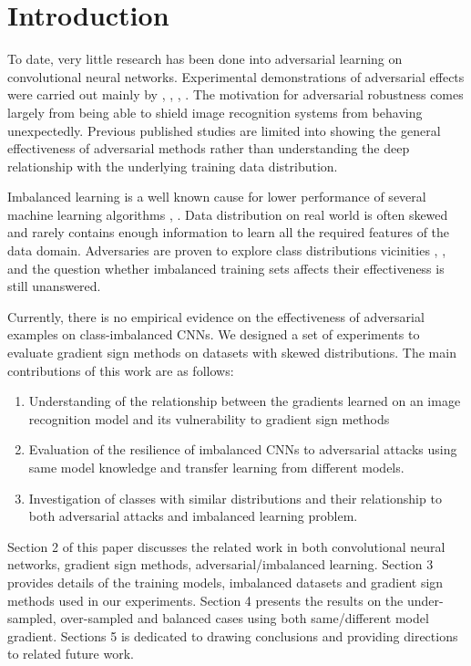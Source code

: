 \documentclass[runningheads,a4paper]{llncs}
\begin{document}
\section{Introduction}


To date, very little research has been done into adversarial learning on convolutional neural networks. Experimental demonstrations of adversarial effects were carried out mainly by \cite{billovits}, \cite{goodfellow2014}, \cite{goodfellow2016}, \cite{papernot2016}. The motivation for adversarial robustness comes largely from being able to shield image recognition systems from behaving unexpectedly. Previous published studies are limited into showing the general effectiveness of adversarial methods rather than understanding the deep relationship with the underlying training data distribution.

Imbalanced learning is a well known cause for lower performance of several machine learning algorithms \cite{japkowicz2002class}, \cite{krawczyk2016learning}. Data distribution on real world is often skewed and rarely contains enough information to learn all the required features of the data domain. Adversaries are proven to explore class distributions vicinities \cite{lowd2005}, \cite{Laskov2010}, and the question whether imbalanced training sets affects their effectiveness is still unanswered. 

Currently, there is no empirical evidence on the effectiveness of adversarial examples on class-imbalanced CNNs. We designed a set of experiments to evaluate gradient sign methods on datasets with skewed distributions. The main contributions of this work are as follows:
\begin{enumerate}
\item Understanding of the relationship between the gradients learned on an image recognition model and its vulnerability to gradient sign methods
\item Evaluation of the resilience of imbalanced CNNs to adversarial attacks using same model knowledge and transfer learning from different models.
\item Investigation of classes with similar distributions and their relationship to both adversarial attacks and imbalanced learning problem.
\end{enumerate}

Section 2 of this paper discusses the related work in both convolutional neural networks, gradient sign methods, adversarial/imbalanced learning. Section 3 provides details of the training models, imbalanced datasets and gradient sign methods used in our experiments. Section 4 presents the results on the under-sampled, over-sampled and balanced cases using both same/different model gradient. Sections 5 is dedicated to drawing conclusions and providing directions to related future work.
\end{document}
